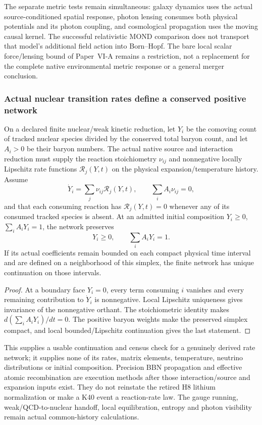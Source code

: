 \documentclass[12pt,a4paper]{article}
\begin{document}
The separate metric tests remain simultaneous: galaxy dynamics uses the
actual source-conditioned spatial response, photon lensing consumes both
physical potentials and its photon coupling, and cosmological propagation
uses the moving causal kernel. The successful relativistic MOND comparison
\cite{SkordisZlosnik2021RelMOND} does not transport that model's additional
field action into Born--Hopf. The bare local scalar force/lensing bound of
Paper~VI-A remains a restriction, not a replacement for the complete
native environmental metric response or a general merger conclusion.

\subsubsection{Actual nuclear transition rates define a conserved positive network}
\begin{proposition}
\label{p6b:prop:v2210-lit-nuclear-network}
On a declared finite nuclear/weak kinetic reduction, let $Y_i$ be the
comoving count of tracked nuclear species divided by the conserved total
baryon count, and let $A_i>0$ be their baryon numbers. The actual native
source and interaction reduction must supply the reaction stoichiometry
$\nu_{ij}$ and nonnegative locally Lipschitz rate functions
$\mathcal R_j(Y,t)$ on the physical expansion/temperature history.
Assume
\[
 \dot Y_i=\sum_j\nu_{ij}\mathcal R_j(Y,t),\qquad
 \sum_iA_i\nu_{ij}=0,
\]
and that each consuming reaction has $\mathcal R_j(Y,t)=0$ whenever
any of its consumed tracked species is absent. At an admitted initial
composition $Y_i\ge0$, $\sum_iA_iY_i=1$, the network preserves
\begin{equation}
\label{p6b:eq:v2210-lit-nuclear-simplex}
 \boxed{Y_i\ge0,\qquad\sum_iA_iY_i=1.}
\end{equation}
If its actual coefficients remain bounded on each compact physical time
interval and are defined on a neighborhood of this simplex, the finite
network has unique continuation on those intervals.
\end{proposition}
\begin{proof}
At a boundary face $Y_i=0$, every term consuming $i$ vanishes and every
remaining contribution to $\dot Y_i$ is nonnegative. Local Lipschitz
uniqueness gives invariance of the nonnegative orthant. The stoichiometric
identity makes $d(\sum_iA_iY_i)/dt=0$. The positive baryon weights make
the preserved simplex compact, and local bounded/Lipschitz continuation
gives the last statement.
\end{proof}
This supplies a usable continuation and census check for a genuinely
derived rate network; it supplies none of its rates, matrix elements,
temperature, neutrino distributions or initial composition. Precision
BBN propagation \cite{Pitrou2018} and effective atomic recombination
\cite{LitCOSAliHaimoudHirata2010} are execution methods after those
interaction/source and expansion inputs exist. They do not reinstate the
retired H8 lithium normalization or make a K40 event a reaction-rate law.
The gauge running, weak/QCD-to-nuclear handoff, local equilibration,
entropy and photon visibility remain actual common-history calculations.
\end{document}
